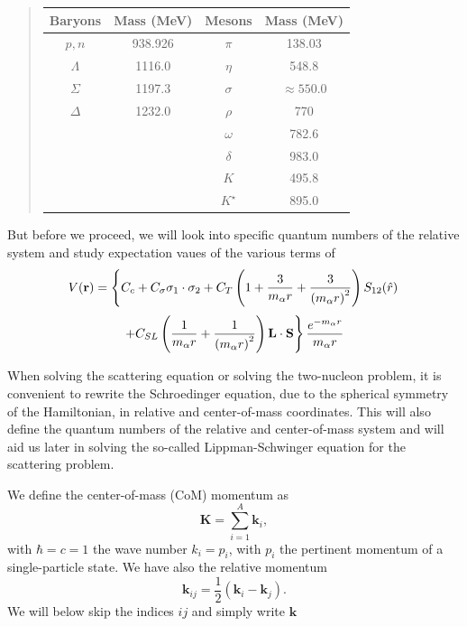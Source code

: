 \documentclass[%
oneside,                 %
final,                   %
10pt]{article}
\begin{document}
\begin{quote}
\begin{tabular}{cccc}
\hline
\multicolumn{1}{c}{ Baryons } & \multicolumn{1}{c}{ Mass (MeV) } & \multicolumn{1}{c}{ Mesons } & \multicolumn{1}{c}{ Mass (MeV) } \\
\hline
$p,n$     & 938.926    & $\pi$       & 138.03          \\
$\Lambda$ & 1116.0     & $\eta$      & 548.8           \\
$\Sigma$  & 1197.3     & $\sigma$    & $\approx 550.0$ \\
$\Delta$  & 1232.0     & $\rho$      & 770             \\
          &            & $\omega$    & 782.6           \\
          &            & $\delta$    & 983.0           \\
          &            & $K$         & 495.8           \\
          &            & $K^{\star}$ & 895.0           \\
\hline
\end{tabular}
\end{quote}

\noindent
But before we proceed, we will look into specific quantum numbers of the relative system and study 
expectation vaues of the various terms of
\[
V(\mathbf{r})= \left\{ C_c + C_\mathbf{\sigma} \mathbf{\sigma}_1\cdot\mathbf{\sigma}_2
 + C_T \left( 1 + {3\over m_\alpha r} + {3\over
\left(m_\alpha r\right)^2}\right) S_{12} (\hat r)\right. 
\]
\[
\left. + C_{SL} \left( {1\over m_\alpha r} + {1\over \left( m_\alpha r\right)^2}
\right) \mathbf{L}\cdot \mathbf{S}
\right\} \frac{e^{-m_\alpha r}}{m_\alpha r}
\]

When solving the scattering equation or solving the two-nucleon problem, it is convenient to rewrite the Schroedinger equation, due to
the spherical symmetry of the Hamiltonian, in relative and center-of-mass coordinates. This will also define the quantum numbers of the relative and center-of-mass system and will aid us later in solving
the so-called Lippman-Schwinger equation for the scattering problem. 

We define the center-of-mass (CoM)  momentum as
 \[
    \mathbf{K}=\sum_{i=1}^A\mathbf{k}_i,
 \]
with $\hbar=c=1$ the wave number $k_i=p_i$, with $p_i$ the pertinent momentum of a single-particle state. 
We have also the relative momentum
\[
    \mathbf{k}_{ij}=\frac{1}{2}(\mathbf{k}_i-\mathbf{k}_j).
 \]
We will below skip the indices $ij$ and simply write $\mathbf{k}$
\end{document}
